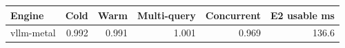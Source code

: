 \begin{tabular}{lrrrrr}
\toprule
Engine & Cold & Warm & Multi-query & Concurrent & E2 usable ms \\
\midrule
vllm-metal & 0.992 & 0.991 & 1.001 & 0.969 & 136.6 \\
\bottomrule
\end{tabular}
